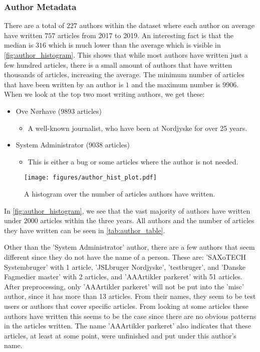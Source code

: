 \subsubsection{Author Metadata}
There are a total of $227$ authors within the dataset where each author on average have written $757$ articles from 2017 to 2019.
An interesting fact is that the median is $316$ which is much lower than the average which is visible in \autoref{fig:author_histogram}.
This shows that while most authors have written just a few hundred articles, there is a small amount of authors that have written thousands of articles, increasing the average.
The minimum number of articles that have been written by an author is $1$ and the maximum number is $9906$.
When we look at the top two most writing authors, we get these:
\begin{itemize}
	\item Ove Nørhave (9893 articles)

	\begin{itemize}
		\item A well-known journalist, who have been at Nordjyske for over 25 years.
	\end{itemize}
	\item System Administrator (9038 articles)

	\begin{itemize}
		\item This is either a bug or some articles where the author is not needed.
	\end{itemize}
\end{itemize}

 
\begin{figure}
	\centering
	\texttt{[image: figures/author\_hist\_plot.pdf]}
	\caption{A histogram over the number of articles authors have written.}
	\label{fig:author_histogram}
\end{figure}
In \autoref{fig:author_histogram}, we see that the vast majority of authors have written under $2000$ articles within the three years. 
All authors and the number of articles they have written can be seen in \autoref{tab:author_table}.

Other than the 'System Administrator' author, there are a few authors that seem different since they do not have the name of a person.
These are: 'SAXoTECH Systembruger' with 1 article, 'JSLbruger Nordjyske', 'testbruger', and 'Danske Fagmedier master' with 2 articles, and 'AAArtikler parkeret' with 51 articles.
After preprocessing, only 'AAArtikler parkeret' will not be put into the 'misc' author, since it has more than 13 articles.
From their names, they seem to be test users or authors that cover specific articles.
From looking at some articles these authors have written this seems to be the case since there are no obvious patterns in the articles written.
The name 'AAArtikler parkeret' also indicates that these articles, at least at some point, were unfinished and put under this author's name.

